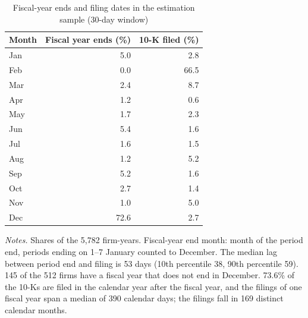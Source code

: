 \begin{table}[htbp]
\centering
\caption{Fiscal-year ends and filing dates in the estimation sample (30-day window)}
\label{tab:timing}
\small
\begin{tabular}{lrr}
\toprule
Month & Fiscal year ends (\%) & 10-K filed (\%) \\
\midrule
Jan & 5.0 & 2.8 \\
Feb & 0.0 & 66.5 \\
Mar & 2.4 & 8.7 \\
Apr & 1.2 & 0.6 \\
May & 1.7 & 2.3 \\
Jun & 5.4 & 1.6 \\
Jul & 1.6 & 1.5 \\
Aug & 1.2 & 5.2 \\
Sep & 5.2 & 1.6 \\
Oct & 2.7 & 1.4 \\
Nov & 1.0 & 5.0 \\
Dec & 72.6 & 2.7 \\
\bottomrule
\end{tabular}
\par\smallskip
\begin{minipage}{\linewidth}\footnotesize
\emph{Notes.} Shares of the 5{,}782 firm-years. Fiscal-year end month: month of the period end, periods ending on 1--7 January counted to December. The median lag between period end and filing is 53 days (10th percentile 38, 90th percentile 59). 145 of the 512 firms have a fiscal year that does not end in December. 73.6\% of the 10-Ks are filed in the calendar year after the fiscal year, and the filings of one fiscal year span a median of 390 calendar days; the filings fall in 169 distinct calendar months.
\end{minipage}
\end{table}
